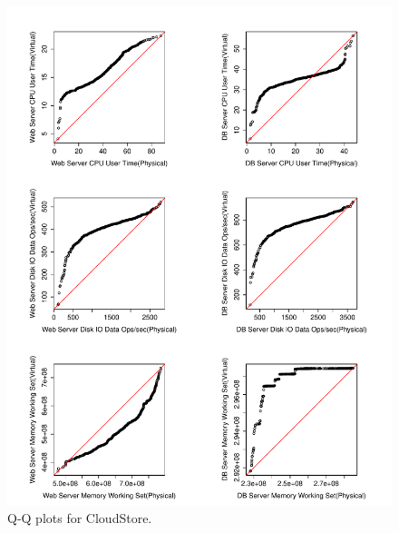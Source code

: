 \begin{figure}[thb]
	\centering
	\includegraphics[width=0.9\columnwidth]{figures/cs_523_qq.pdf}
	\caption{Q-Q plots for CloudStore.}
	\label{fig:qqcs}
\end{figure}

